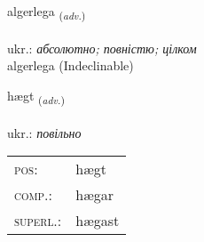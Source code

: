 \documentclass[frontgrid, backgrid]{flacards}\usepackage[]{graphicx}\usepackage[]{xcolor}
\begin{document}

\renewcommand{\flhead}{\vskip5pt \fboxsep=0pt {\small\bfseries\footnotesize Atviksorð | прислівник}}
\renewcommand{\fcfoot}{\vskip5pt \fboxsep=0pt \hspace{2pt}{\small\bfseries\footnotesize 2K}}

\renewcommand{\blhead}{\vskip5pt {\small\bfseries\footnotesize Atviksorð | прислівник }}
\renewcommand{\bcfoot}{\vskip5pt \hspace{2pt}{\small\bfseries\footnotesize 2K}}


{algerlega \small{\textsubscript{(\textit{adv.})}} \\[1ex]
\textphonetic{[alcɛrlɛɣa]} \\
ukr.: \emph{абсолютно; повністю; цілком} \\  [2ex]
algerlega (Indeclinable)}

\renewcommand{\flhead}{\vskip5pt \fboxsep=0pt {\small\bfseries\footnotesize Atviksorð | прислівник}}
\renewcommand{\fcfoot}{\vskip5pt \fboxsep=0pt \hspace{2pt}{\small\bfseries\footnotesize 2K}}

\renewcommand{\blhead}{\vskip5pt {\small\bfseries\footnotesize Atviksorð | прислівник }}
\renewcommand{\bcfoot}{\vskip5pt \hspace{2pt}{\small\bfseries\footnotesize 2K}}


{hægt \small{\textsubscript{(\textit{adv.})}} \\[1ex] %
\textphonetic{[haixt]} \\
ukr.: \emph{повільно} \\  [2ex]
\renewcommand*{\arraystretch}{0.8}
\begin{tabular}{ll}
\textsc{pos}: & hægt \\ 
\textsc{comp.}: & hægar \\ 
\textsc{superl.}: & hægast \\
\end{tabular}
}

\renewcommand{\flhead}{\vskip5pt \fboxsep=0pt {\small\bfseries\footnotesize Nafnorð | іменник}}
\renewcommand{\fcfoot}{\vskip5pt \fboxsep=0pt \hspace{2pt}{\small\bfseries\footnotesize 2K}}
\end{document}
